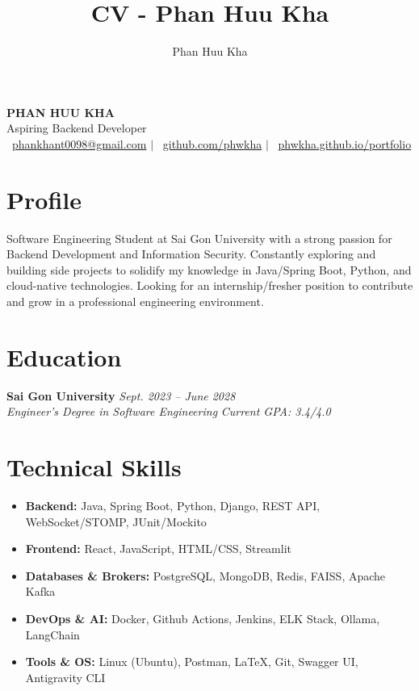 \documentclass[a4paper,10pt]{article}
\title{CV - Phan Huu Kha}
\author{Phan Huu Kha}
\date{}
\begin{document}
\pagestyle{empty} %

\begin{center}
    {\huge \textbf{PHAN HUU KHA}} \\
    \vspace{4pt}
    {\large Aspiring Backend Developer} \\
    \vspace{6pt}
    \faEnvelope\ \href{mailto:phankhant0098@gmail.com}{phankhant0098@gmail.com} $\vert$ 
    \faGithub\ \href{https://github.com/phwkha}{github.com/phwkha} $\vert$ 
    \faGlobe\ \href{https://phwkha.github.io/portfolio/}{phwkha.github.io/portfolio}
\end{center}


\section{Profile}
Software Engineering Student at Sai Gon University with a strong passion for Backend Development and Information Security. Constantly exploring and building side projects to solidify my knowledge in Java/Spring Boot, Python, and cloud-native technologies. Looking for an internship/fresher position to contribute and grow in a professional engineering environment.

 \section{Education}
    \vspace{10pt}
    \textbf{Sai Gon University} \hfill \textit{Sept. 2023 -- June 2028} \\
    \textit{Engineer's Degree in Software Engineering} \hfill \textit{Current GPA: 3.4/4.0}

\section{Technical Skills}
\vspace{10pt}
\begin{itemize}[leftmargin=0.15in, label={}]
    \item \textbf{Backend:} Java, Spring Boot, Python, Django, REST API, WebSocket/STOMP, JUnit/Mockito
    \item \textbf{Frontend:} React, JavaScript, HTML/CSS, Streamlit
    \item \textbf{Databases \& Brokers:} PostgreSQL, MongoDB, Redis, FAISS, Apache Kafka
    \item \textbf{DevOps \& AI:} Docker, Github Actions, Jenkins, ELK Stack, Ollama, LangChain
    \item \textbf{Tools \& OS:} Linux (Ubuntu), Postman, LaTeX, Git, Swagger UI, Antigravity CLI
\end{itemize}
\end{document}
